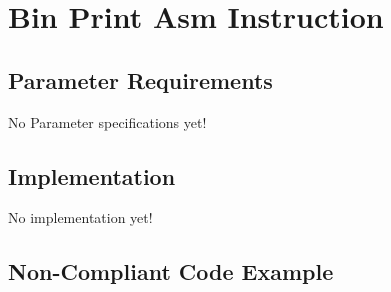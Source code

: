 %
%

\section{Bin Print Asm Instruction}
\label{BinPrintAsmInstruction::overview}


\subsection{Parameter Requirements}

   No Parameter specifications yet!

\subsection{Implementation}

   No implementation yet!

\subsection{Non-Compliant Code Example}


